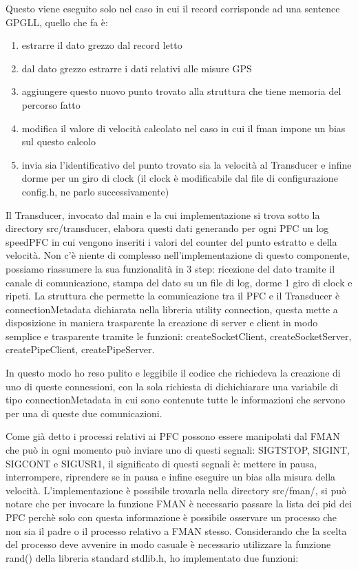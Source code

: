 \documentclass{article}
\begin{document}
\begin{flushleft}
Questo viene eseguito solo nel caso in cui il record corrisponde ad una sentence GPGLL, quello che fa è:

\begin{enumerate}
    \item estrarre il dato grezzo dal record letto
    \item dal dato grezzo estrarre i dati relativi alle misure GPS
    \item aggiungere questo nuovo punto trovato alla struttura che tiene memoria del percorso fatto
    \item modifica il valore di velocità calcolato nel caso in cui il fman impone un bias sul questo calcolo
    \item invia sia l'identificativo del punto trovato sia la velocità al Transducer e infine dorme per un giro di clock (il clock è modificabile dal file di configurazione config.h, ne parlo successivamente)
\end{enumerate}

Il Transducer, invocato dal main e la cui implementazione si trova sotto la directory src/transducer, elabora questi dati generando per ogni PFC un log speedPFC in cui vengono inseriti i valori del counter del punto estratto e della velocità. Non c'è niente di complesso nell'implementazione di questo componente, possiamo riassumere la sua funzionalità in 3 step: ricezione del dato tramite il canale di comunicazione, stampa del dato su un file di log, dorme 1 giro di clock e ripeti. La struttura che permette la comunicazione tra il PFC e il Transducer è connectionMetadata dichiarata nella libreria utility connection, questa mette a disposizione in maniera trasparente la creazione di server e client in modo semplice e trasparente tramite le funzioni: createSocketClient, createSocketServer, createPipeClient, createPipeServer.

In questo modo ho reso pulito e leggibile il codice che richiedeva la creazione di uno di queste connessioni, con la sola richiesta di dichichiarare una variabile di tipo connectionMetadata in cui sono contenute tutte le informazioni che servono per una di queste due comunicazioni.

Come già detto i processi relativi ai PFC possono essere manipolati dal FMAN che può in ogni momento può inviare uno di questi segnali: SIGTSTOP, SIGINT, SIGCONT e SIGUSR1, il significato di questi segnali è: mettere in pausa, interrompere, riprendere se in pausa e infine eseguire un bias alla misura della velocità. L'implementazione è possibile trovarla nella directory src/fman/, si può notare che per invocare la funzione FMAN è necessario passare la lista dei pid dei PFC perchè solo con questa informazione è possibile osservare un processo che non sia il padre o il processo relativo a FMAN stesso. Considerando che la scelta del processo deve avvenire in modo casuale è necessario utilizzare la funzione rand() della libreria standard stdlib.h, ho implementato due funzioni:


\end{flushleft}
\end{document}
